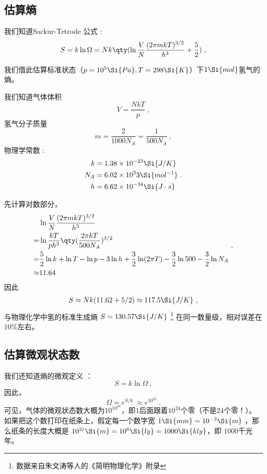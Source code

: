 


\subsection{估算熵}
我们知道Sackur-Tetrode 公式 :
\begin{equation}
S = k\ln \Omega  = Nk \qty(\ln \frac{V}{N} \frac{(2\pi mkT)^{3/2}}{h^3} + \frac52)~,
\end{equation}

我们借此估算标准状态（$p=10^5 \Si{Pa}, T=298\Si{K}$）下$1 \Si{mol}$氢气的熵。

我们知道气体体积 
$$V=\frac{NkT}{p}~,$$
氢气分子质量 
$$m = \frac{2}{1000 N_A} = \frac{1}{500 N_A}~,$$
物理学常数 : 
$$
\begin{aligned}
k &= 1.38 \times 10^{-23}\Si{J/K}\\
N_A &= 6.02 \times 10^23 \Si{mol^{-1}}\\
h &= 6.62\times10^{-34} \Si{J\cdot s}
\end{aligned}
~.$$

先计算对数部分，
$$
\begin{aligned}
 & \ln \frac{V}{N} \frac{(2\pi mkT)^{3/2}}{h^3} \\
 = & \ln \frac{kT}{p h^3} \qty(\frac{2\pi kT}{500 N_A})^{3/2}\\
 = & \frac{5}{2} \ln k + \ln T - \ln p - 3 \ln h + \frac{3}{2} \ln (2 \pi T) - \frac{3}{2} \ln 500 - \frac{3}{2} \ln N_A \\
 \approx & 11.64\\
\end{aligned}~,
$$
因此
$$
\begin{aligned}
S \approx Nk (11.62+5/2) \approx 117.5 \Si{J/K}
\end{aligned}~,
$$
与物理化学中氢的标准生成熵 $S = 130.57 \Si{J/K}$ \footnote{数据来自朱文涛等人的《简明物理化学》附录} 在同一数量级，相对误差在$10\%$左右。

\subsection{估算微观状态数}
我们还知道熵的微观定义  ：
\begin{equation}
S = k \ln \Omega~,
\end{equation}
因此，
$$
\Omega = e^{S/k}~ \approx e^{10^{25}} ~.
$$
可见，气体的微观状态数大概为$10^{10^{24}}$，即$1$后面跟着$10^{24}$个零（不是$24$个零！）。
如果把这个数打印在纸条上，假定每一个数字宽 $1 \Si{mm} = 10^{-3} \Si{m}$ ，那么纸条的长度大概是 $10^{21} \Si{m} = 10^6 \Si{ly} = 1000 \Si{kly}$，即 $1000$千光年。
